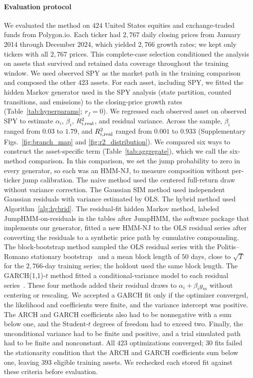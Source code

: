 \paragraph{Evaluation protocol}

We evaluated the method on $424$ United States equities and exchange-traded funds
from Polygon.io. Each ticker had $2{,}767$ daily closing prices from
January 2014 through December $2024$, which yielded $2{,}766$ growth rates; we kept only tickers with all
$2{,}767$ prices. This complete-case selection conditioned the analysis on assets
that survived and retained data coverage throughout the training
window. We used observed SPY as the market path in the training
comparison and composed the other $423$ assets. For each asset, including SPY, we fitted the hidden Markov generator used in the SPY analysis
(state partition, counted transitions, and emissions) to the
closing-price growth rates
(Table~\ref{tab:hyperparams}; $r_f=0$). We regressed each observed
asset on observed SPY to estimate $\alpha_i$, $\beta_i$,
$R^2_{i,\mathrm{real}}$, and residual variance. Across the sample, $\beta_i$
ranged from $0.03$ to $1.79$, and $R^2_{i,\mathrm{real}}$ ranged from $0.001$
to $0.933$ (Supplementary Figs.~\ref{fig:branch_map} and \ref{fig:r2_distribution}).
We compared six ways to construct the asset-specific term
(Table~\ref{tab:aggregate}), which we call the six-method comparison.
In this comparison, we set the jump probability to zero in every
generator, so each was an HMM-NJ, to measure composition without
per-ticker jump calibration. The naive method used the centered
full-return draw without variance correction. The Gaussian SIM method
used independent Gaussian residuals with variance estimated by OLS.
The hybrid method used Algorithm~\ref{alg:hybrid}. The residual-fit
hidden Markov method, labeled JumpHMM-on-residuals in the tables after JumpHMM, the
software package that implements our generator, fitted a new HMM-NJ to the OLS residual series after converting the
residuals to a synthetic price path by cumulative compounding. The
block-bootstrap method sampled the OLS residual series with the
Politis--Romano stationary bootstrap~\cite{politisRomano1994} and a
mean block length of $50$ days, close to $\sqrt{T}$ for the
$2{,}766$-day training series; the holdout used the same block
length. The GARCH(1,1)-$t$ method
fitted a conditional-variance model to each residual
series~\cite{bollerslev1986}. These four methods added their residual
draws to $\alpha_i+\beta_i g_m$ without centering or rescaling. We accepted a GARCH fit only if the
optimizer converged, the likelihood and coefficients were finite, and
the variance intercept was positive. The ARCH and GARCH coefficients
also had to be nonnegative with a sum below one, and the Student-$t$
degrees of freedom had to exceed two. Finally, the unconditional
variance had to be finite and positive, and a trial simulated path had
to be finite and nonconstant. All $423$ optimizations converged; $30$ fits failed the stationarity
condition that the ARCH and GARCH coefficients sum below one, leaving
$393$ eligible training assets. We rechecked each stored fit against
these criteria before evaluation.

